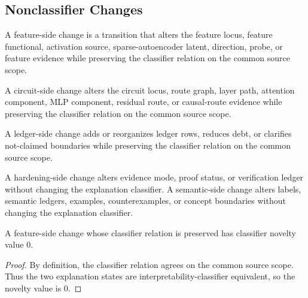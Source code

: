 \subsection{Nonclassifier Changes}
\label{subsec:philosophy-nonclassifier-changes}

\begin{definition}
\label{def:philosophy-feature-side-change}

A feature-side change is a transition that alters the feature locus,
feature functional, activation source, sparse-autoencoder latent,
direction, probe, or feature evidence while preserving the classifier
relation on the common source scope.
\end{definition}

\begin{definition}
\label{def:philosophy-circuit-side-change}
A circuit-side change alters the circuit locus, route graph, layer path,
attention component, MLP component, residual route, or causal-route
evidence while preserving the classifier relation on the common source
scope.
\end{definition}

\begin{definition}
\label{def:philosophy-ledger-side-change}
A ledger-side change adds or reorganizes ledger rows, reduces debt, or
clarifies not-claimed boundaries while preserving the classifier relation
on the common source scope.
\end{definition}

\begin{definition}
\label{def:philosophy-hardening-semantic-side-changes}
A hardening-side change alters evidence mode, proof status, or
verification ledger without changing the explanation classifier. A
semantic-side change alters labels, semantic ledgers, examples,
counterexamples, or concept boundaries without changing the explanation
classifier.
\end{definition}

\begin{theorem}
\label{thm:philosophy-feature-side-change-no-classifier-novelty}
A feature-side change whose classifier relation is preserved has
classifier novelty value $0$.
\end{theorem}
\begin{proof}
By definition, the classifier relation agrees on the common source scope.
Thus the two explanation states are interpretability-classifier
equivalent, so the novelty value is $0$.
\end{proof}

